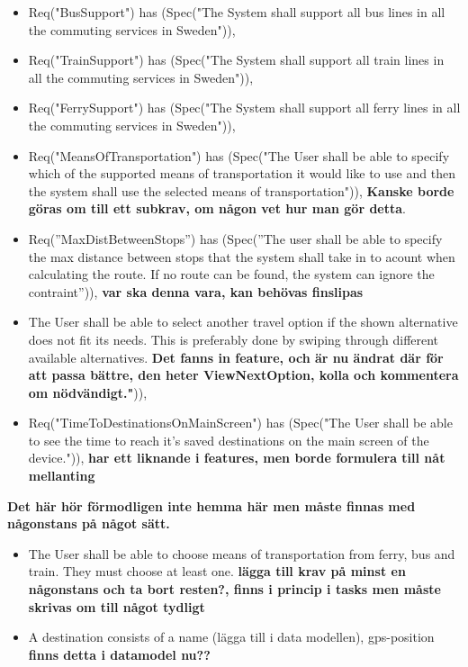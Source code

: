 \documentclass[a4paper]{article}
\begin{document}
				\begin{itemize}
					\item Req("BusSupport") has (Spec("The System shall support all bus lines in all the commuting services in Sweden")),
					\item Req("TrainSupport") has (Spec("The System shall support all train lines in all the commuting services in Sweden")),
					\item Req("FerrySupport") has (Spec("The System shall support all ferry lines in all the commuting services in Sweden")),
					\item Req("MeansOfTransportation") has (Spec("The User shall be able to specify which of the supported means of transportation it would like to use and then the system shall use the selected means of transportation")), \textbf{Kanske borde göras om till ett subkrav, om någon vet hur man gör detta}. 
					\item Req(''MaxDistBetweenStops'') has (Spec(''The user shall be able to specify the max distance between stops that the system shall take in to acount when calculating the route. If no route can be found, the system can ignore the contraint'')), \textbf{var ska denna vara, kan behövas finslipas}


					\item The User shall be able to select another travel option if the shown alternative does not fit its needs. This 				is preferably done by swiping through different available alternatives. \textbf{Det fanns in feature, och är nu ändrat där för att passa bättre, den heter ViewNextOption, kolla och kommentera om nödvändigt."})),
					\item Req("TimeToDestinationsOnMainScreen") has (Spec("The User shall be able to see the time to reach it's saved destinations on the main screen of the device.")), \textbf{har ett liknande i features, men borde formulera till nåt mellanting}
				\end{itemize}	
					
					
				\textbf{Det här hör förmodligen inte hemma här men måste finnas med någonstans på något sätt.}
				\begin{itemize}
					\item The User shall be able to choose means of transportation from ferry, bus and train. They must choose at least one. \textbf{lägga till krav på minst en någonstans och ta bort resten?, finns i princip i tasks men måste skrivas om till något tydligt}
					\item A destination consists of a name (lägga till i data modellen), gps-position \textbf{finns detta i datamodel nu??}
				\end{itemize}
\end{document}
